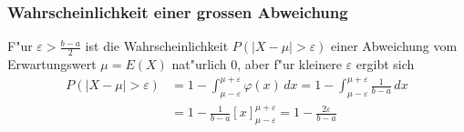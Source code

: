 \subsubsection{Wahrscheinlichkeit einer grossen Abweichung}
{\small
F"ur $\varepsilon>\frac{b-a}2$ ist die Wahrscheinlichkeit
$P(|X-\mu|>\varepsilon)$
einer Abweichung vom Erwartungswert $\mu=E(X)$ nat"urlich $0$,
aber f"ur kleinere $\varepsilon$ ergibt sich
\begin{align*}
P(|X-\mu|>\varepsilon)
&=1-\int_{\mu-\varepsilon}^{\mu+\varepsilon}\varphi(x)\,dx
=1-\int_{\mu-\varepsilon}^{\mu+\varepsilon}\frac{1}{b-a}\,dx\\
&=1-\frac1{b-a}\left[x\right]_{\mu-\varepsilon}^{\mu+\varepsilon}=1-\frac{2\varepsilon}{b-a}
\end{align*}
}
